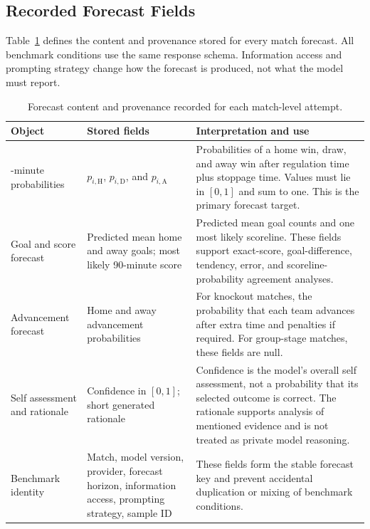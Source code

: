\documentclass[sigconf,nonacm]{acmart}
\begin{document}
\subsection{Recorded Forecast Fields}

Table~\ref{tab:forecast-fields} defines the content and provenance stored for every match forecast. All benchmark conditions use the same response schema. Information access and prompting strategy change how the forecast is produced, not what the model must report.

\begin{table}[t]
  \caption{Forecast content and provenance recorded for each match-level attempt.}
  \label{tab:forecast-fields}
  \centering
  \small
  \begin{tabularx}{\textwidth}{>{\raggedright\arraybackslash}p{}
    >{\raggedright\arraybackslash}p{}X}
    \toprule
    \textbf{Object} & \textbf{Stored fields} & \textbf{Interpretation and use} \\
    \midrule
    90-minute probabilities &
    $p_{i,\mathrm{H}}$, $p_{i,\mathrm{D}}$, and $p_{i,\mathrm{A}}$ &
    Probabilities of a home win, draw, and away win after regulation time plus stoppage time. Values must lie in $[0,1]$ and sum to one. This is the primary forecast target. \\

    Goal and score forecast &
    Predicted mean home and away goals; most likely 90-minute score &
    Predicted mean goal counts and one most likely scoreline. These fields support exact-score, goal-difference, tendency, error, and scoreline-probability agreement analyses. \\

    Advancement forecast &
    Home and away advancement probabilities &
    For knockout matches, the probability that each team advances after extra time and penalties if required. For group-stage matches, these fields are null. \\

    Self assessment and rationale &
    Confidence in $[0,1]$; short generated rationale &
    Confidence is the model's overall self assessment, not a probability that its selected outcome is correct. The rationale supports analysis of mentioned evidence and is not treated as private model reasoning. \\

    Benchmark identity &
    Match, model version, provider, forecast horizon, information access, prompting strategy, sample ID &
    These fields form the stable forecast key and prevent accidental duplication or mixing of benchmark conditions. \\


\end{tabularx}
\end{table}
\end{document}
